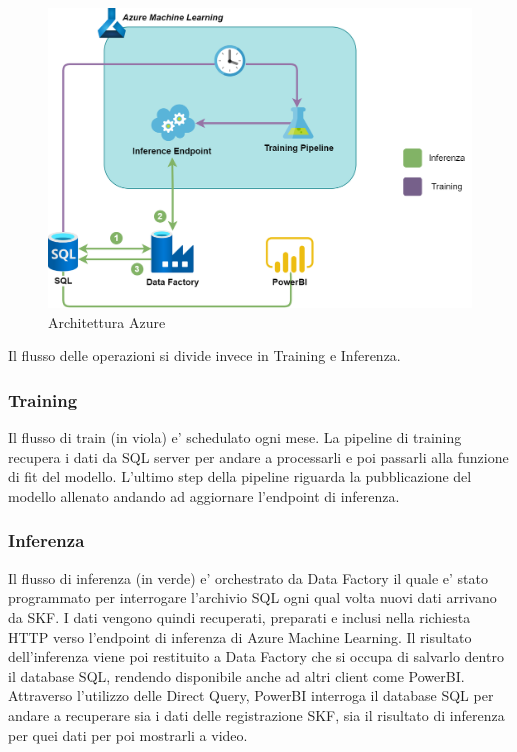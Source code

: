 \begin{figure}[t]
		
	\centering
	\includegraphics[width=14cm, scale=1]{images/deploy_scheme}
	\caption{Architettura Azure}
	\label{azure}
	
\end{figure}


Il flusso delle operazioni si divide invece in Training e Inferenza.

\subsubsection{Training}
Il flusso di train (in viola) e' schedulato ogni mese. La pipeline di training recupera i dati da SQL server per andare a processarli e poi passarli alla funzione di fit del modello. L'ultimo step della pipeline riguarda la pubblicazione del modello allenato andando ad aggiornare l'endpoint di inferenza.

\subsubsection{Inferenza}
Il flusso di inferenza (in verde) e' orchestrato da Data Factory il quale e' stato programmato per interrogare l'archivio SQL ogni qual volta nuovi dati arrivano da SKF. I dati vengono quindi recuperati, preparati e inclusi nella richiesta HTTP verso l'endpoint di inferenza di Azure Machine Learning. Il risultato dell'inferenza viene poi restituito a Data Factory che si occupa di salvarlo dentro il database SQL, rendendo disponibile anche ad altri client come PowerBI. Attraverso l'utilizzo delle Direct Query, PowerBI interroga il database SQL per andare a recuperare sia i dati delle registrazione SKF, sia il risultato di inferenza per quei dati per poi mostrarli a video.



